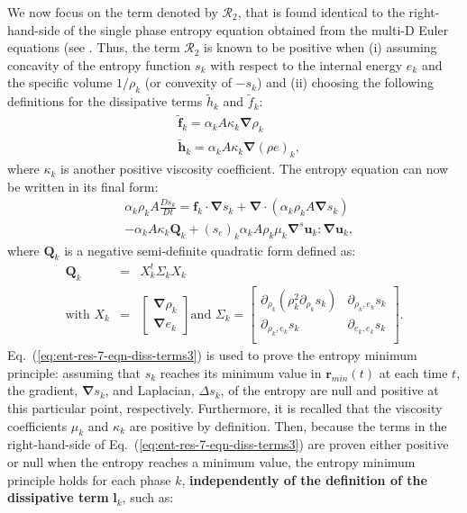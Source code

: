 \documentclass[preprint,10pt]{elsarticle}
\renewcommand{\div}{\mbold{\nabla}\! \cdot \!}
\newcommand{\grad}{\mbold{\nabla}}
\newcommand{\mbold}[1]{\boldsymbol#1}
\newcommand{\eqt}[1]{Eq.~(\ref{#1})}                     %
\begin{document}
We now focus on the term denoted by $\mathcal{R}_2$, that is found identical to the right-hand-side of the single phase entropy equation obtained from the multi-D Euler equations (see \cite{jlg, Marco_paper_low_mach}. Thus, the term $\mathcal{R}_2$ is known to be positive when (i) assuming concavity of the entropy function $s_k$ with respect to the internal energy $e_k$ and the specific volume $1 / \rho_k$ (or convexity of $-s_k$) and (ii) choosing the following definitions for the dissipative terms $\tilde{h}_k$ and $\tilde{f}_k$:
%
\begin{subequations}
\begin{align}
&\tilde{\mbold f}_k = \alpha_k A \kappa_k \grad \rho_k \\
&\tilde{\mbold h}_k = \alpha_k A \kappa_k \grad \left( \rho e \right)_k,
\end{align}
\end{subequations}
%  
where $\kappa_k$ is another positive viscosity coefficient. The entropy equation can now be written in its final form:
%
\begin{align}\label{eq:ent-res-7-eqn-diss-terms3}
&\alpha_k \rho_k A \frac{Ds_k}{Dt} =  \mbold f_k \cdot \grad s_k + \div \left( \alpha_k \rho_k A \grad s_k \right)  \nonumber\\
&- \alpha_k A \kappa_k \mathbf{Q}_k + (s_e)_k \alpha_k A \rho_k \mu_k \grad^s \mbold u_k : \grad \mbold u_k,
\end{align}
%
where $\mathbf{Q}_k$ is a negative semi-definite quadratic form defined as:
%
\begin{eqnarray}
\mathbf{Q}_k &=& X^t_k \Sigma_k X_k \nonumber \\
\text{with } X_k &=& \begin{bmatrix}
\grad \rho_k \\
\grad e_k 
\end{bmatrix}
\text{and } \Sigma_k = \begin{bmatrix}
       \partial_{\rho_k} (\rho^2_k \partial_{\rho_k} s_k) & \partial_{\rho_k,e_k} s_k  \\[0.3em]
       \partial_{\rho_k,e_k} s_k & \partial_{e_k,e_k} s_k           \\[0.3em]
     \end{bmatrix}. \nonumber 
\end{eqnarray}
%
\eqt{eq:ent-res-7-eqn-diss-terms3} is used to prove the entropy minimum principle: assuming that $s_k$ reaches its minimum value in $\mbold r_{min}(t)$ at each time $t$, the gradient, $\grad s_k$, and Laplacian, $\Delta s_k$,  of the entropy are null and positive at this particular point, respectively. Furthermore, it is recalled that the viscosity coefficients $\mu_k$ and $\kappa_k$ are positive by definition. Then, because the terms in the right-hand-side of \eqt{eq:ent-res-7-eqn-diss-terms3} are proven either positive or null when the entropy reaches a minimum value, the entropy minimum principle holds for each phase $k$, \textbf{independently of the definition of the dissipative term} $\mbold l_k$, such as:
\end{document}
